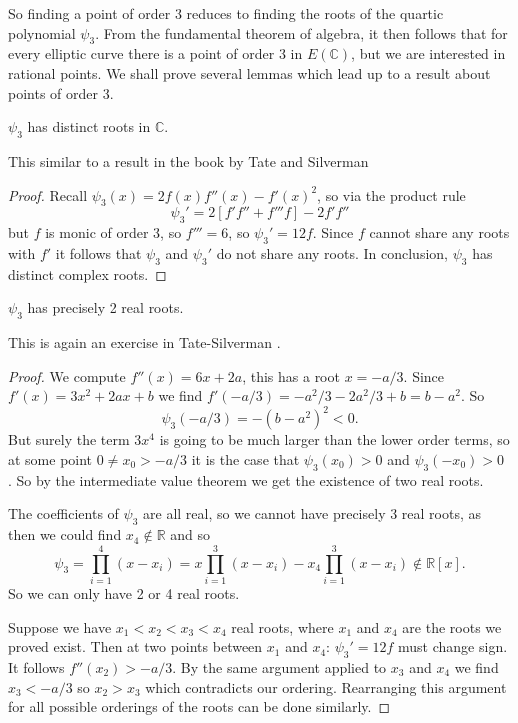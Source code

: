So finding a point of order 3 reduces to finding the roots
of the quartic polynomial $\psi_3$.
From the fundamental theorem of algebra, it then follows
that for every elliptic curve there is a point of order
3 in $E(\mathbb{C})$, but we are interested in rational
points. We shall prove several lemmas which lead up to a
result about points of order 3.
\begin{lemma}
  $\psi_3$ has distinct roots in $\mathbb{C}$.
\end{lemma}
This similar to a result in the book by Tate and Silverman \cite[theorem 2.1]{silvermanRationalPoints}
\begin{proof}
  Recall $\psi_3(x) = 2 f(x)f''(x) - f'(x)^2$, so via the product
  rule
  \[ \psi_3' = 2 \left[ f'f'' + f'''f \right] - 2f'f'' \]
  but $f$ is monic of order 3, so $f''' = 6$, so
  $\psi_3' = 12f$. Since $f$ cannot share any roots with $f'$
  it follows that $\psi_3$ and $\psi_3'$ do not share any roots.
  In conclusion, $\psi_3$ has distinct complex roots.
\end{proof}
\begin{lemma}
  $\psi_3$ has precisely 2 real roots.
\end{lemma}
This is again an exercise in Tate-Silverman \cite[Exercise 2.2b]{silvermanRationalPoints}.
\begin{proof}
  We compute $f''(x) = 6x + 2a$, this has a root $x = -a/3$.
  Since $f'(x) = 3x^2 + 2ax + b$ we find $f'(-a/3) = -a^2/3 -2a^2/3 + b = b - a^2$.
  So
  \[ \psi_3(-a/3) = -(b-a^2)^2 < 0. \]
  But surely the term $3x^4$ is going to be much larger than the lower
  order terms, so at some point $0 \neq x_0 > -a/3$ it is the case that $\psi_3(x_0) > 0$ and $\psi_3(-x_0) > 0$ .
  So by the intermediate value theorem \cite[theorem 4.35]{sutherlandMTS}
  we get the existence of two real roots.

  The coefficients of $\psi_3$ are all real, so we cannot have
  precisely 3 real roots, as then we could find $x_4 \notin \mathbb{R}$
  and so
  \[ \psi_3 = \prod_{i=1}^{4} (x - x_i) = x \prod_{i=1}^{3}(x-x_i) - x_4 \prod_{i=1}^{3} (x - x_i) \notin \mathbb{R}[x].  \]
  So we can only have 2 or 4 real roots.

  Suppose we have $x_1 < x_2 < x_3 < x_4$ real roots, where
  $x_1$ and $x_4$ are the roots we proved exist.
  Then at two points between $x_1$ and $x_4$: $\psi_3' = 12f$ must change sign.
  It follows $f''(x_2) > -a/3$. By the same argument applied to $x_3$ and
  $x_4$ we find $x_3 < -a/3$ so $x_2 > x_3$ which contradicts our ordering.
  Rearranging this argument for all possible orderings of the roots
  can be done similarly.
\end{proof}

